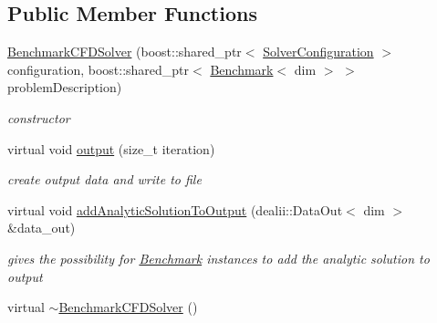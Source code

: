 \subsection*{Public Member Functions}
\begin{DoxyCompactItemize}
\item 
\hypertarget{classnatrium_1_1BenchmarkCFDSolver_aa9cdc67e4218230f54d74b0182170705}{
\hyperlink{classnatrium_1_1BenchmarkCFDSolver_aa9cdc67e4218230f54d74b0182170705}{BenchmarkCFDSolver} (boost::shared\_\-ptr$<$ \hyperlink{classnatrium_1_1SolverConfiguration}{SolverConfiguration} $>$ configuration, boost::shared\_\-ptr$<$ \hyperlink{classnatrium_1_1Benchmark}{Benchmark}$<$ dim $>$ $>$ problemDescription)}
\label{classnatrium_1_1BenchmarkCFDSolver_aa9cdc67e4218230f54d74b0182170705}

\begin{DoxyCompactList}\small\item\em constructor \item\end{DoxyCompactList}\item 
\hypertarget{classnatrium_1_1BenchmarkCFDSolver_a9708132fc0cef4ae55e3453672891c81}{
virtual void \hyperlink{classnatrium_1_1BenchmarkCFDSolver_a9708132fc0cef4ae55e3453672891c81}{output} (size\_\-t iteration)}
\label{classnatrium_1_1BenchmarkCFDSolver_a9708132fc0cef4ae55e3453672891c81}

\begin{DoxyCompactList}\small\item\em create output data and write to file \item\end{DoxyCompactList}\item 
\hypertarget{classnatrium_1_1BenchmarkCFDSolver_a96be8add7c888ef4e6a1cb41cd2b40f6}{
virtual void \hyperlink{classnatrium_1_1BenchmarkCFDSolver_a96be8add7c888ef4e6a1cb41cd2b40f6}{addAnalyticSolutionToOutput} (dealii::DataOut$<$ dim $>$ \&data\_\-out)}
\label{classnatrium_1_1BenchmarkCFDSolver_a96be8add7c888ef4e6a1cb41cd2b40f6}

\begin{DoxyCompactList}\small\item\em gives the possibility for \hyperlink{classnatrium_1_1Benchmark}{Benchmark} instances to add the analytic solution to output \item\end{DoxyCompactList}\item 
\hypertarget{classnatrium_1_1BenchmarkCFDSolver_aafd3c01db648420ce6d98a8349bdfa09}{
virtual \hyperlink{classnatrium_1_1BenchmarkCFDSolver_aafd3c01db648420ce6d98a8349bdfa09}{$\sim$BenchmarkCFDSolver} ()}
\label{classnatrium_1_1BenchmarkCFDSolver_aafd3c01db648420ce6d98a8349bdfa09}


\end{DoxyCompactItemize}
